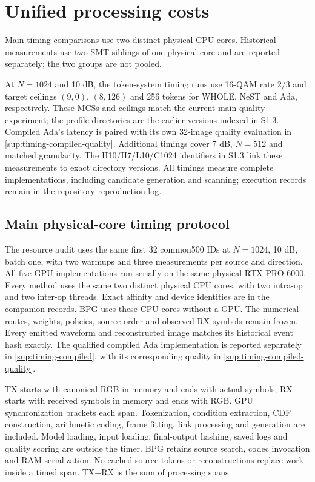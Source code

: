 \documentclass[10pt,letterpaper]{article}
\begin{document}
\clearpage
\section{Unified processing costs}\label{sup:7}
Main timing comparisons use two distinct physical CPU cores. Historical measurements use two SMT siblings of one physical core and are reported separately; the two groups are not pooled.


At $N=1024$ and 10 dB, the token-system timing runs use 16-QAM rate 2/3 and target ceilings $(9,0)$, $(8,126)$ and 256 tokens for WHOLE, NeST and Ada, respectively. These MCSs and ceilings match the current main quality experiment; the profile directories are the earlier versions indexed in S1.3. Compiled Ada's latency is paired with its own 32-image quality evaluation in \ref{sup:timing-compiled-quality}. Additional timings cover 7 dB, $N=512$ and matched granularity. The H10/H7/L10/C1024 identifiers in S1.3 link these measurements to exact directory versions. All timings measure complete implementations, including candidate generation and scanning; execution records remain in the repository reproduction log.

\subsection{Main physical-core timing protocol}\label{sup:timing-main}
The resource audit uses the same first 32 common500 IDs at $N=1024$, 10 dB, batch one, with two warmups and three measurements per source and direction. All five GPU implementations run serially on the same physical RTX PRO 6000. Every method uses the same two distinct physical CPU cores, with two intra-op and two inter-op threads. Exact affinity and device identities are in the companion records. BPG uses these CPU cores without a GPU. The numerical routes, weights, policies, source order and observed RX symbols remain frozen. Every emitted waveform and reconstructed image matches its historical event hash exactly. The qualified compiled Ada implementation is reported separately in \ref{sup:timing-compiled}, with its corresponding quality in \ref{sup:timing-compiled-quality}.

TX starts with canonical RGB in memory and ends with actual symbols; RX starts with received symbols in memory and ends with RGB. GPU synchronization brackets each span. Tokenization, condition extraction, CDF construction, arithmetic coding, frame fitting, link processing and generation are included. Model loading, input loading, final-output hashing, saved logs and quality scoring are outside the timer. BPG retains source search, codec invocation and RAM serialization. No cached source tokens or reconstructions replace work inside a timed span. TX+RX is the sum of processing spans.
\end{document}
